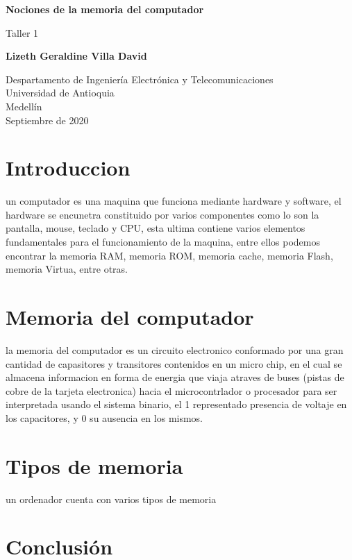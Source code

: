 \documentclass{article}
\begin{document}
\begin{titlepage}
    \begin{center}
        \vspace*{1cm}
            
        \Huge
        \textbf{Nociones de la memoria del computador}
            
        \vspace{0.5cm}
        \LARGE
        Taller 1
            
        \vspace{1.5cm}
            
        \textbf{Lizeth Geraldine Villa David}
            
        \vfill
            
        \vspace{0.8cm}
            
        \Large
        Despartamento de Ingeniería Electrónica y Telecomunicaciones\\
        Universidad de Antioquia\\
        Medellín\\
        Septiembre de 2020
            
    \end{center}
\end{titlepage}

\tableofcontents

\section{Introduccion}\label{contenido}

un computador es una maquina que funciona mediante hardware y software, 
el hardware se encunetra constituido por varios componentes
como lo son la pantalla, mouse, teclado y CPU, esta ultima contiene varios 
elementos fundamentales para el funcionamiento de la maquina, 
entre ellos podemos encontrar la memoria RAM, memoria ROM, memoria  cache, 
memoria Flash, memoria Virtua, entre otras. 

\section{Memoria del computador}\label{contenido}

la memoria del computador es un circuito electronico conformado por una gran cantidad de 
capasitores y transitores contenidos en un micro chip, en el cual se almacena informacion en 
forma de energia que viaja atraves de buses (pistas de cobre de la tarjeta electronica) hacia el microcontrlador o procesador
para ser interpretada usando el sistema binario, el 1 representado presencia de voltaje en los capacitores, 
y 0 su ausencia en los mismos.

\section{Tipos de memoria} \label{contenido}

un ordenador cuenta con varios tipos de memoria 



\section{Conclusión} \label{conclulsion}



\end{document}
